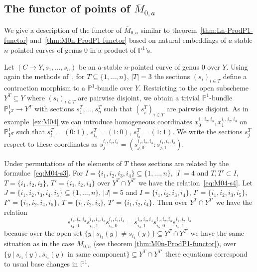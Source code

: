 \documentclass[ALCO,ThmDefs,Unicode,epreuves]{cedram}
\def\P{\mathds P}
\begin{document}
\subsection{The functor of points of \texorpdfstring{$\overline{M}_{0,a}$}{M0,a}}

We give a description of the functor of $\overline{M}_{0,a}$ similar to 
theorem~\ref{thm:Ln-ProdP1-functor} and~\ref{thm:M0n-ProdP1-functor} 
based on natural embeddings of $a$-stable $n$-pointed curves of genus $0$ 
in a product of $\P^1$'s.


Let $(C\to Y,s_1,\ldots,s_n)$ be an $a$-stable $n$-pointed curve of genus $0$ over $Y$. 
Using again the methods of~\cite{Kn83}, for $T\subseteq\{1,\ldots,n\}$, $|T|=3$ 
the sections $(s_i)_{i\in T}$ define a contraction morphism to a $\P^1$-bundle over $Y$.
Restricting to the open subscheme $Y^T\subseteq Y$ where $(s_i)_{i\in T}$ are 
pairwise disjoint, we obtain a trivial $\P^1$-bundle $\P^1_{Y^T}\to Y^T$ 
with sections $s^T_1,\ldots,s^T_n$ such that $(s^T_i)_{i\in T}$ are pairwise disjoint.
As in example~\ref{ex:M04} we can introduce homogeneous coordinates 
$x^{i_1,i_2,i_3}_0,x^{i_1,i_2,i_3}_1$ on $\P^1_{Y^T}$ such that 
$s^T_{i_1}=(0:1)$, $s^T_{i_2}=(1:0)$, $s^T_{i_3}=(1:1)$. We write the sections 
$s^T_j$ respect to these coordinates as 
$s^{i_1,i_2,i_3}_j=(s^{i_1,i_2,i_3}_{j,0}:s^{i_1,i_2,i_3}_{j,1})$.

Under permutations of the elements of $T$ these sections are related by the 
formulae~\eqref{eq:M04-s3}.
For $I=\{i_1,i_2,i_3,i_4\}\subseteq\{1,\ldots,n\}$, $|I|=4$ and
$T,T'\subset I$, $T=\{i_1,i_2,i_3\}$, $T'=\{i_1,i_2,i_4\}$ over 
$Y^T\cap Y^{T'}$ we have the relation~\eqref{eq:M04-s4}.
Let $J=\{i_1,i_2,i_3,i_4,i_5\}\subseteq\{1,\ldots,n\}$, $|J|=5$ 
and $I=\{i_1,i_2,i_3,i_4\}$, $I'=\{i_1,i_2,i_3,i_5\}$, $I''=\{i_1,i_2,i_4,i_5\}$, 
$T=\{i_1,i_2,i_3\}$, $T'=\{i_1,i_2,i_4\}$. Then over $Y^T\cap Y^{T'}$ we have the relation
\begin{equation}\label{eq:M0a-3}
s^{i_1,i_2,i_3}_{i_4,0}s^{i_1,i_2,i_3}_{i_5,1}s^{i_1,i_2,i_4}_{i_5,0}
=s^{i_1,i_2,i_3}_{i_4,1}s^{i_1,i_2,i_3}_{i_5,0}s^{i_1,i_2,i_4}_{i_5,1}
\end{equation}
because over the open set $\{y\:|\:s_{i_3}(y)\neq s_{i_4}(y)\}\subseteq Y^T\cap Y^{T'}$ 
we have the same situation as in the case $\overline{M}_{0,n}$ (see theorem 
\ref{thm:M0n-ProdP1-functor}), over 
$\{y\:|\:\text{$s_{i_3}(y),s_{i_4}(y)$ in same component}\}\subseteq Y^T\cap Y^{T'}$
these equations correspond to usual base changes in $\P^1$.
\end{document}
